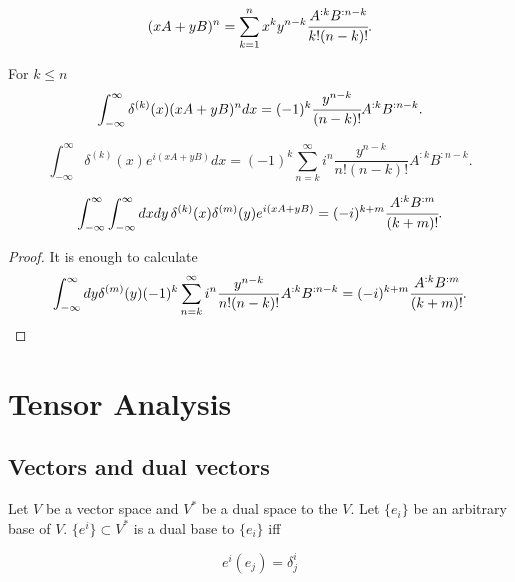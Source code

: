 \documentclass[main.tex]{subfiles}
\begin{document}
\begin{lemma}
\begin{equation}
(xA + yB)^n = \sum_{k=1}^n x^k y^{n - k} \cfrac{A^{:k}B^{:n-k}}{k!(n - k)!}.
\end{equation}
\end{lemma}

\begin{lemma} For $k \leq n$
\begin{equation}
\int_{-\infty}^{\infty} \delta^{(k)}(x) (xA + yB)^n dx = (-1)^k \cfrac{y^{n - k}}{(n - k)!} A^{:k}B^{:n-k}.
\end{equation}
\end{lemma}

\begin{lemma}
\begin{equation}
\int_{-\infty}^{\infty} \delta^{(k)}(x) e^{i(xA + yB)}dx =
(-1)^k \sum_{n = k}^\infty i^n \frac{y^{n - k}}{n!(n-k)!} A^{:k}B^{:n-k}.
\end{equation}
\end{lemma}

\begin{lemma}
\begin{equation}
\int_{-\infty}^{\infty} \int_{-\infty}^{\infty} dx dy\, \delta^{(k)}(x) \delta^{(m)}(y) e^{i(xA + yB)} = (-i)^{k + m}\cfrac{A^{:k}B^{:m}}{(k + m)!}.
\end{equation}
\end{lemma}
\begin{proof}
It is enough to calculate
\begin{equation}
\int_{-\infty}^\infty dy \delta^{(m)}(y) (-1)^k \sum_{n = k}^\infty i^n \frac{y^{n - k}}{n!(n-k)!} A^{:k}B^{:n-k} = (-i)^{k + m}\cfrac{A^{:k}B^{:m}}{(k + m)!}.
\end{equation}
\end{proof}

\section{Tensor Analysis}
\subsection{Vectors and dual vectors}

Let $V$ be a vector space and $V^*$ be a dual space to the $V$. Let $\{e_i\}$ be an arbitrary base of $V$. $\{e^i\}\subset V^*$ is a dual base to $\{e_i\}$ iff

\begin{equation}
\boxed{e^i(e_j) = \delta^i_j}
\end{equation}
\end{document}
